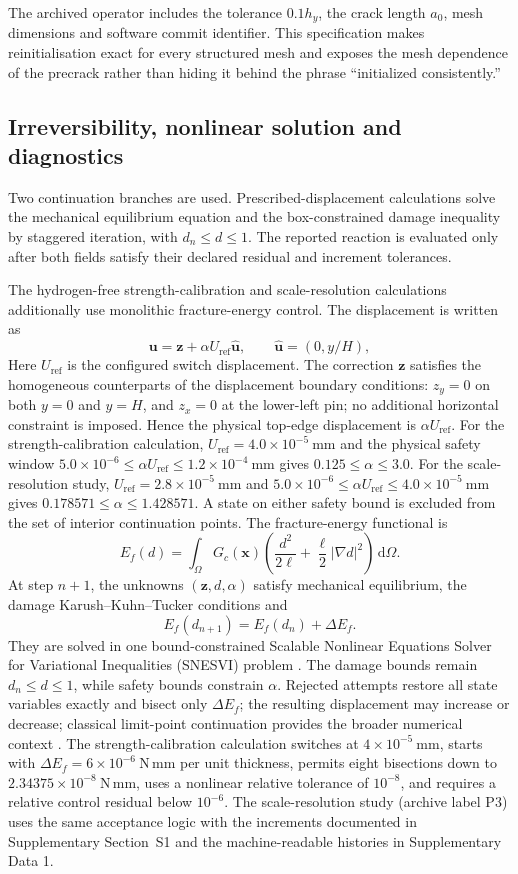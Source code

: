 \documentclass[preprint,12pt]{elsarticle}
\begin{document}
The archived operator includes the tolerance $0.1h_y$, the crack length $a_0$,
mesh dimensions and software commit identifier. This specification makes reinitialisation exact for every structured mesh and exposes
the mesh dependence of the precrack rather than hiding it behind the phrase
``initialized consistently.''
\subsection{Irreversibility, nonlinear solution and diagnostics}
Two continuation branches are used. Prescribed-displacement calculations solve
the mechanical equilibrium equation and the box-constrained damage inequality by
staggered iteration, with $d_n\le d\le1$. The reported reaction is evaluated only
after both fields satisfy their declared residual and increment tolerances.

The hydrogen-free strength-calibration and scale-resolution calculations
additionally use monolithic fracture-energy control. The displacement is written as
\[
\mathbf{u}=\mathbf{z}+\alpha U_{\mathrm{ref}}\widehat{\mathbf{u}},
\qquad \widehat{\mathbf{u}}=(0,y/H),
\]
Here $U_{\mathrm{ref}}$ is the configured switch displacement. The correction
$\mathbf{z}$ satisfies the homogeneous counterparts of the displacement boundary
conditions: $z_y=0$ on both $y=0$ and $y=H$, and $z_x=0$ at the lower-left pin;
no additional horizontal constraint is imposed. Hence the physical top-edge
displacement is $\alpha U_{\mathrm{ref}}$. For the strength-calibration
calculation, $U_{\mathrm{ref}}=4.0\times10^{-5}~\mathrm{mm}$ and the physical safety window
$5.0\times10^{-6}\le\alpha U_{\mathrm{ref}}\le1.2\times10^{-4}~\mathrm{mm}$
gives $0.125\le\alpha\le3.0$. For the scale-resolution study,
$U_{\mathrm{ref}}=2.8\times10^{-5}~\mathrm{mm}$ and
$5.0\times10^{-6}\le\alpha U_{\mathrm{ref}}\le4.0\times10^{-5}~\mathrm{mm}$
gives $0.178571\le\alpha\le1.428571$. A state on either safety bound is excluded from the set of interior continuation points.
The fracture-energy functional is
\[
E_f(d)=\int_{\Omega}G_c(\mathbf{x})
\left(\frac{d^2}{2\ell}+\frac{\ell}{2}|\nabla d|^2\right)\,\mathrm{d}\Omega .
\]
At step $n+1$, the unknowns $(\mathbf{z},d,\alpha)$ satisfy mechanical
equilibrium, the damage Karush--Kuhn--Tucker conditions and
\[
E_f(d_{n+1})=E_f(d_n)+\Delta E_f .
\]
They are solved in one bound-constrained Scalable Nonlinear Equations Solver for
Variational Inequalities (SNESVI) problem \cite{balay2024}. The damage bounds remain
$d_n\le d\le1$, while safety bounds constrain $\alpha$. Rejected attempts restore
all state variables exactly and bisect only $\Delta E_f$; the resulting displacement may increase or decrease; classical limit-point continuation provides the broader numerical context \cite{riks1979}. The strength-calibration calculation switches at
$4\times10^{-5}~\mathrm{mm}$, starts with
$\Delta E_f=6\times10^{-6}~\mathrm{N\,mm}$ per unit thickness, permits eight
bisections down to $2.34375\times10^{-8}~\mathrm{N\,mm}$, uses a nonlinear
relative tolerance of $10^{-8}$, and requires a relative control residual below
$10^{-6}$. The scale-resolution study (archive label P3) uses the same acceptance logic with the increments documented in
Supplementary Section~S1 and the machine-readable histories in Supplementary Data 1.
\end{document}

